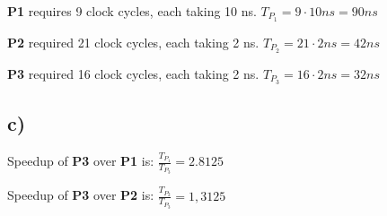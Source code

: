 \textbf{P1} requires 9 clock cycles, each taking 10 ns. $ T_{P_1} = 9 \cdot 10 \textit{ns} = 90 \textit{ns} $

\textbf{P2} required 21 clock cycles, each taking 2 ns. $ T_{P_2} = 21 \cdot 2 \textit{ns} = 42 \textit{ns} $

\textbf{P3} required 16 clock cycles, each taking 2 ns. $ T_{P_3} = 16 \cdot 2 \textit{ns} = 32 \textit{ns} $

\subsection*{\textbf{c)}}

Speedup of \textbf{P3} over \textbf{P1} is: $ \frac{T_{P_1}}{T_{P_3}} = 2.8125 $

Speedup of \textbf{P3} over \textbf{P2} is: $ \frac{T_{P_2}}{T_{P_3}} = 1,3125 $

\newpage